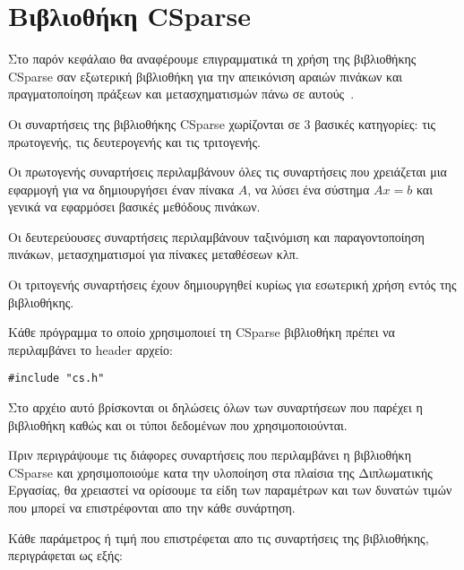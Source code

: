 \chapter{Βιβλιοθήκη CSparse}
\label{ch:chapterCSparse}

Στο παρόν κεφάλαιο θα αναφέρουμε επιγραμματικά τη χρήση της βιβλιοθήκης CSparse σαν εξωτερική βιβλιοθήκη για την απεικόνιση αραιών πινάκων και πραγματοποίηση πράξεων και μετασχηματισμών πάνω σε αυτούς~\cite{davis2006direct}.

Οι συναρτήσεις της βιβλιοθήκης CSparse χωρίζονται σε 3 βασικές κατηγορίες: τις πρωτογενής, τις δευτερογενής και τις τριτογενής.

Οι πρωτογενής συναρτήσεις περιλαμβάνουν όλες τις συναρτήσεις που χρειάζεται μια εφαρμογή για να δημιουργήσει έναν πίνακα $A$, να λύσει ένα σύστημα $Ax=b$ και γενικά να εφαρμόσει βασικές μεθόδους πινάκων.

Οι δευτερεύουσες συναρτήσεις περιλαμβάνουν ταξινόμιση και παραγοντοποίηση πινάκων, μετασχηματισμοί για πίνακες μεταθέσεων κλπ.

Οι τριτογενής συναρτήσεις έχουν δημιουργηθεί κυρίως για εσωτερική χρήση εντός της βιβλιοθήκης.

Κάθε πρόγραμμα το οποίο χρησιμοποιεί τη CSparse βιβλιοθήκη πρέπει να περιλαμβάνει το header αρχείο: 
\begin{verbatim}#include "cs.h"\end{verbatim}

Στο αρχέιο αυτό βρίσκονται οι δηλώσεις όλων των συναρτήσεων που παρέχει η βιβλιοθήκη καθώς και οι τύποι δεδομένων που χρησιμοποιούνται. 

Πριν περιγράψουμε τις διάφορες συναρτήσεις που περιλαμβάνει η βιβλιοθήκη CSparse και χρησιμοποιούμε κατα την υλοποίηση στα πλαίσια της Διπλωματικής Εργασίας, θα χρειαστεί να ορίσουμε τα είδη των παραμέτρων και των δυνατών τιμών που μπορεί να επιστρέφονται απο την κάθε συνάρτηση.

Κάθε παράμετρος ή τιμή που επιστρέφεται απο τις συναρτήσεις της βιβλιοθήκης, περιγράφεται ως εξής:

